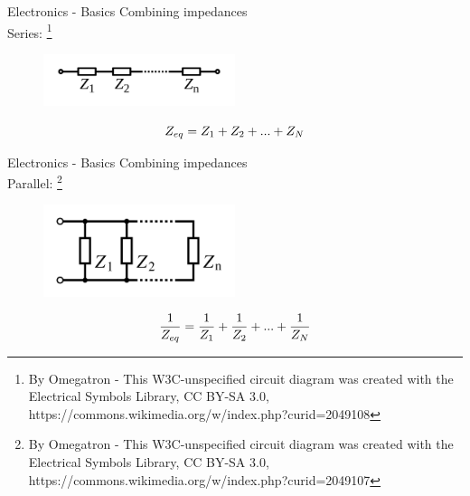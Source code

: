 \documentclass{beamer}
\newcommand\blfootnote[1]{%
  \begingroup
  \renewcommand\thefootnote{}\footnote{#1}%
  \addtocounter{footnote}{-1}%
  \endgroup
}
\begin{document}
\begin{frame}{Electronics - Basics}
    Combining impedances\\
    \vspace{5mm}
    Series:\blfootnote{By Omegatron - This W3C-unspecified circuit diagram was created with the Electrical Symbols Library, CC BY-SA 3.0, https://commons.wikimedia.org/w/index.php?curid=2049108}
    \begin{figure}[h]
        \includegraphics[width=0.5\textwidth]{series.png}
    \end{figure}
    \begin{equation*}
        \Large
        Z_{eq} = Z_1 + Z_2 + ... + Z_N
    \end{equation*}
\end{frame}

\begin{frame}{Electronics - Basics}
    Combining impedances\\
    \vspace{5mm}
    Parallel:\blfootnote{By Omegatron - This W3C-unspecified circuit diagram was created with the Electrical Symbols Library, CC BY-SA 3.0, https://commons.wikimedia.org/w/index.php?curid=2049107}
    \begin{figure}[h]
        \includegraphics[width=0.5\textwidth]{parallel.png}
    \end{figure}
    \begin{equation*}
        \Large
        \frac{1}{Z_{eq}} = \frac{1}{Z_1} + \frac{1}{Z_2} + ... + \frac{1}{Z_N}
    \end{equation*}
\end{frame}
\end{document}
